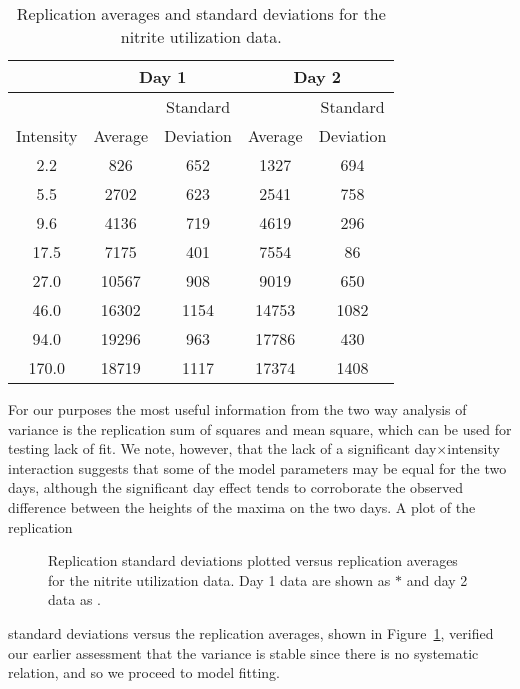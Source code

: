 \begin{table}
  \caption{
  Replication averages and standard deviations for the nitrite
  utilization data.}\label{tbl:3.3}
  \begin{center}
    \begin{tabular}{ccccc}\hline
      &\multicolumn{2}{c}{Day 1} & \multicolumn{2}{c}{Day 2}\\ \hline
      && \multicolumn{1}{c}{Standard} && \multicolumn{1}{c}{Standard}\\
      \multicolumn{1}{c}{Intensity}
      &\multicolumn{1}{c}{Average}&\multicolumn{1}{c}{Deviation} &
      \multicolumn{1}{c}{Average} & \multicolumn{1}{c}{Deviation}\\ \hline
      2.2&826&652&1327&694\\
      5.5&2702&623&2541&758\\
      9.6&4136&719&4619&296\\
      17.5&7175&401&7554&86\\
      27.0&10567&908&9019&650\\
      46.0&16302&1154&14753&1082\\
      94.0&19296&963&17786&430\\
      170.0&18719&1117&17374&1408\\ \hline
    \end{tabular}
  \end{center}
\end{table}
For our purposes the most useful information from the two way analysis
of variance is the replication sum of squares and mean square,
which can be used for testing lack of fit.
We note, however, that the lack of a significant
day$\times$intensity interaction suggests that some of the model parameters
may be equal for the two days, although the
significant day effect tends to corroborate the observed
difference between the heights of the maxima on the two days.
A plot of the replication
\begin{figure}
  \vspace{2.75in}
  \caption{Replication standard deviations plotted versus replication
    averages for the nitrite utilization data.  Day 1 data are shown
    as $*$ and day 2 data as .}
  \label{fig:NITrep}
\end{figure}
standard deviations versus the replication averages, shown in
Figure~\ref{fig:NITrep}, verified our earlier assessment that the
variance is stable since there is no systematic relation,
and so we proceed to model fitting.

